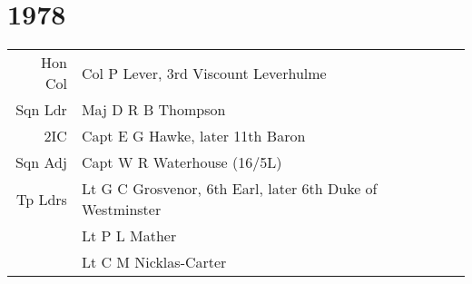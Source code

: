 \chapter*{1978}

\begin{center}
  \small
  \begin{tabular}{rl}
    Hon Col & Col P Lever, 3rd Viscount Leverhulme \\
    Sqn Ldr & Maj D R B Thompson \\
    2IC & Capt E G Hawke, later 11th Baron \\
    Sqn Adj & Capt W R Waterhouse (16/5L) \\
    Tp Ldrs & Lt G C Grosvenor, 6th Earl, later 6th Duke of Westminster \\
      & Lt P L Mather \\
      & Lt C M Nicklas-Carter \\
  \end{tabular}
\end{center}

